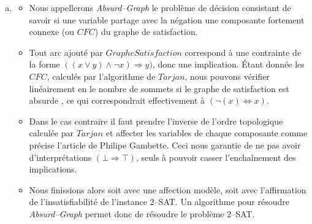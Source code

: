 \begin{enumerate}[(a)]
\item 
\begin{itemize}
\item Nous appellerons \emph{Absurd--Graph} le problème de décision consistant de savoir si une variable partage avec la négation une composante fortement connexe (ou $CFC$) du graphe de satisfaction. 
\item Tout arc ajouté par $GrapheSatisfaction$ correspond à une contrainte de la forme $((x \vee y) \wedge \neg x) \Rightarrow y)$, donc une implication. Étant donnée les $CFC$, calculés par l'algorithme de $Tarjan$, nous pouvons vérifier linéairement en le nombre de sommets si le graphe de satisfaction est \og absurde \fg, ce qui correspondrait effectivement à $(\neg(x) \Leftrightarrow x)$.
\item Dans le cas contraire il faut prendre l'inverse de l'ordre topologique calculée par $Tarjan$ et affecter les variables de chaque composante comme précise l'article de Philipe Gambette. Ceci nous garantie de ne pas avoir d'interprétations $( \bot \Rightarrow \top )$, seuls à pouvoir casser l'enchaînement des implications. 
\item Nous finissions alors soit avec une affection modèle, soit avec l'affirmation de l'insatisfiabilité de l'instance 2--SAT. Un algorithme pour résoudre \emph{Absurd--Graph} permet donc de résoudre le problème 2--SAT.
\end{itemize}
\end{enumerate}
